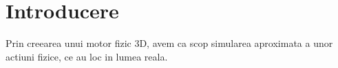 \chapter*{Introducere} 

Prin creearea unui motor fizic 3D, avem ca scop simularea aproximata a unor actiuni fizice, ce au loc in lumea reala.